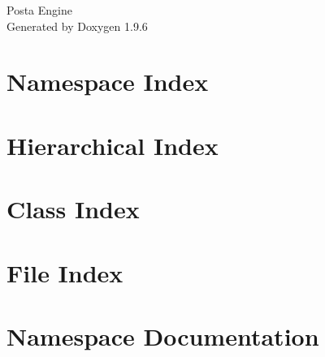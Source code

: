 \documentclass[twoside]{book}
\newcommand{\+}{\discretionary{\mbox{\scriptsize$\hookleftarrow$}}{}{}}
\newcommand{\clearemptydoublepage}{%
    \newpage{\pagestyle{empty}\cleardoublepage}%
  }
\begin{document}
  \raggedbottom
    \hypersetup{pageanchor=false,
                bookmarksnumbered=true,
                pdfencoding=unicode
               }
  \begin{titlepage}
  \vspace*{7cm}
  \begin{center}%
  {\Large Posta Engine}\\
  \vspace*{1cm}
  {\large Generated by Doxygen 1.9.6}\\
  \end{center}
  \end{titlepage}
  \clearemptydoublepage
  \tableofcontents
  \clearemptydoublepage
  \hypersetup{pageanchor=true}
\chapter{Namespace Index}

\chapter{Hierarchical Index}

\chapter{Class Index}

\chapter{File Index}

\chapter{Namespace Documentation}









\end{document}
